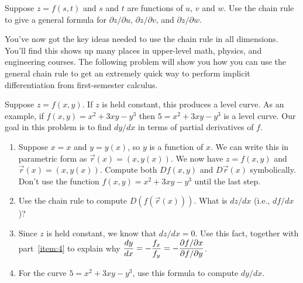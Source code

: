 \begin{problem}%
%
 Suppose $z=f(s,t)$ and $s$ and $t$ are functions of $u$, $v$ and $w$.  Use the chain rule to give a general formula for $\partial z/\partial u$, $\partial z/\partial v$, and $\partial z/\partial w$. 
\end{problem}

You've now got the key ideas needed to use the chain rule in all dimensions. You'll find this shows up many places in upper-level math, physics, and engineering courses. The following problem will show you how you can use the general chain rule to get an extremely quick way to perform implicit differentiation from first-semester calculus.

\begin{problem}%
%
 Suppose $z=f(x,y)$.  If $z$ is held constant, this produces a level curve. As an example, if $f(x,y) = x^2+3xy-y^3$ then $5=x^2+3xy-y^3$ is a level curve. Our goal in this problem is to find $dy/dx$ in terms of partial derivatives of $f$.
\begin{enumerate}
 \item Suppose $x=x$ and $y=y(x)$, so $y$ is a function of $x$.  We can write this in parametric form as $\vec r(x) = (x,y(x))$. We now have $z=f(x,y)$ and $\vec r(x)=(x,y(x))$.  Compute both $Df(x,y)$ and $D\vec r(x)$ symbolically.  Don't use the function $f(x,y)=x^2+3xy-y^3$ until the last step. 
 \item\label{item:4} Use the chain rule to compute $D(f(\vec r(x)))$. What is $dz/dx$ (i.e., $df/dx$)?
 \item Since $z$ is held constant, we know that $dz/dx=0$. Use this fact, together with part~\ref{item:4} to explain why $\displaystyle \frac{dy}{dx} = -\frac{f_x}{f_y} = -\frac{\partial f/ \partial x}{\partial f/ \partial y}$.
 \item For the curve $5=x^2+3xy-y^3$, use this formula to compute $dy/dx$.
\end{enumerate}

\end{problem}



